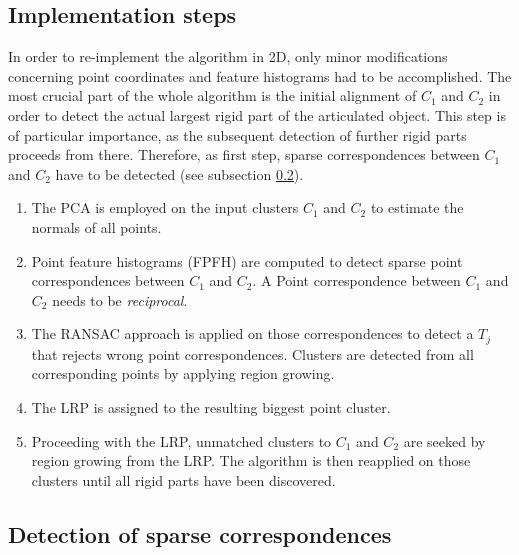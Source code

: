 \subsection{Implementation steps}

In order to re-implement the algorithm in 2D, only minor modifications concerning point coordinates and feature histograms had to be accomplished. The most crucial part of the whole algorithm is the initial alignment of $C_1$ and $C_2$ in order to detect the actual largest rigid part of the articulated object. This step is of particular importance, as the subsequent detection of further rigid parts proceeds from there. Therefore, as first step, sparse correspondences between $C_1$ and $C_2$ have to be detected (see subsection \ref{correspondences}).
\begin{enumerate}
	\item The PCA is employed on the input clusters $C_1$ and $C_2$ to estimate the normals of all points.
	\item Point feature histograms (FPFH) are computed to detect sparse point correspondences between $C_1$ and $C_2$. A Point correspondence between $C_1$ and $C_2$ needs to be \textit{reciprocal}.
	\item The RANSAC approach is applied on those correspondences to detect a $T_j$ that rejects wrong point correspondences. Clusters are detected from all corresponding points by applying region growing.
	\item The LRP is assigned to the resulting biggest point cluster.
	\item Proceeding with the LRP, unmatched clusters to $C_1$ and $C_2$ are seeked by region growing from the LRP. The algorithm is then reapplied on those clusters until all rigid parts have been discovered.
\end{enumerate}

\subsection{Detection of sparse correspondences}
\label{correspondences}


